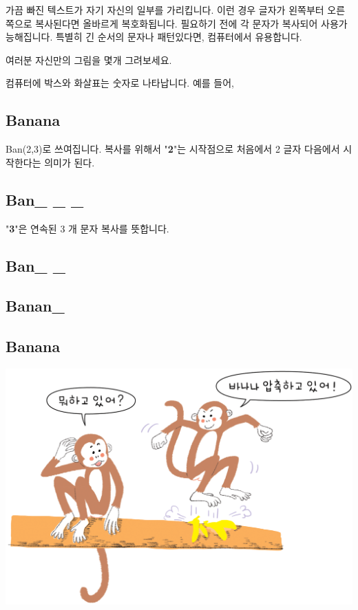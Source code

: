 \documentclass[]{article}
\begin{document}
가끔 빠진 텍스트가 자기 자신의 일부를 가리킵니다. 이런 경우 글자가
왼쪽부터 오른쪽으로 복사된다면 올바르게 복호화됩니다. 필요하기 전에 각
문자가 복사되어 사용가능해집니다. 특별히 긴 순서의 문자나 패턴있다면,
컴퓨터에서 유용합니다.

여러분 자신만의 그림을 몇개 그려보세요.

컴퓨터에 박스와 화살표는 숫자로 나타납니다. 예를 들어,

\subsection{Banana}

Ban(2,3)로 쓰여집니다. 복사를 위해서 "\textbf{2}"는 시작점으로 처음에서
2 글자 다음에서 시작한다는 의미가 된다.

\subsection{Ban\_ \_ \_}

"\textbf{3}"은 연속된 3 개 문자 복사를 뜻합니다.

\subsection{Ban\_ \_}

\subsection{Banan\_}

\subsection{Banana}

\includegraphics{csunplugged/01-part/img/ch03-text/03-text-04-banana-02.png}
\end{document}
